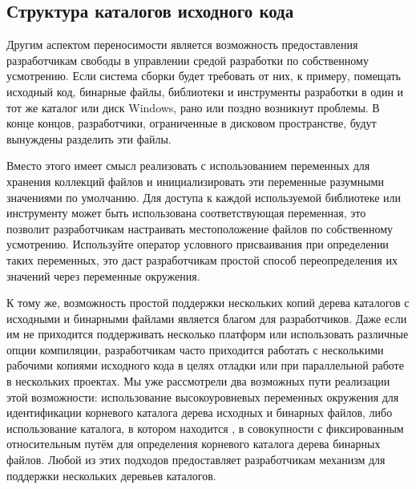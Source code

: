 \subsection*{Структура каталогов исходного кода}

Другим аспектом переносимости является возможность предоставления
разработчикам свободы в управлении средой разработки по собственному
усмотрению. Если система сборки будет требовать от них, к примеру,
помещать исходный код, бинарные файлы, библиотеки и инструменты
разработки в один и тот же каталог или диск Windows, рано или поздно
возникнут проблемы. В конце концов, разработчики, ограниченные в
дисковом пространстве, будут вынуждены разделить эти файлы.

Вместо этого имеет смысл реализовать \Makefile{} с использованием
переменных для хранения коллекций файлов и инициализировать эти
переменные разумными значениями по умолчанию. Для доступа к каждой
используемой библиотеке или инструменту может быть использована
соответствующая переменная, это позволит разработчикам настраивать
местоположение файлов по собственному усмотрению. Используйте оператор
условного присваивания при определении таких переменных, это даст
разработчикам простой способ переопределения их значений через
переменные окружения.

К тому же, возможность простой поддержки нескольких копий дерева
каталогов с исходными и бинарными файлами является благом для
разработчиков. Даже если им не приходится поддерживать несколько
платформ или использовать различные опции компиляции, разработчикам
часто приходится работать с несколькими рабочими копиями исходного
кода в целях отладки или при параллельной работе в нескольких
проектах. Мы уже рассмотрели два возможных пути реализации этой
возможности: использование высокоуровневых переменных окружения для
идентификации корневого каталога дерева исходных и бинарных файлов,
либо использование каталога, в котором находится \Makefile{}, в
совокупности с фиксированным относительным путём для определения
корневого каталога дерева бинарных файлов. Любой из этих подходов
предоставляет разработчикам механизм для поддержки нескольких деревьев
каталогов.
